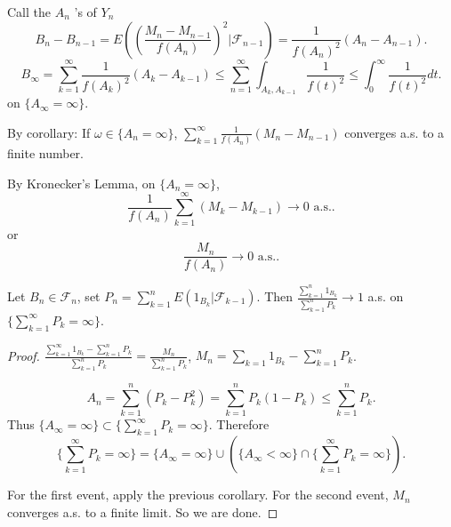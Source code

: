 
Call the $A_n$ 's of $Y_n$ 
\[
	B_n - B_{n-1}  = E\left( \left( \frac{M_n - M_{n-1}}{f(A_n)} \right) ^2  | \mathcal{F}_{n-1} \right) = \frac{1}{f(A_n)^2} (A_n - A_{n-1})
.\] 
\[
	B_\infty = \sum_{k = 1}^\infty \frac{1}{f(A_k)^2} (A_k - A_{k-1}) \le \sum_{n= 1}^\infty \int _{A_k, A_{k-1}} \frac{1}{f(t)^2} \le \int _0^\infty \frac{1}{f(t)^2} dt
.\] 
on $\{A_\infty  = \infty \} $.

By corollary: If $\omega \in \{A_n = \infty \} $,
$\sum_{k=1}^{\infty} \frac{1}{f(A_n)}(M_n - M_{n-1})$ converges a.s. to a finite number.

By Kronecker's Lemma, on $\{A_n = \infty \} $,
\[
	\frac{1}{f(A_n)}\sum_{k=1}^{\infty} (M_k - M_{k-1}) \to  0 \text{ a.s.}
.\] 
or
\[
	\frac{M_n}{f(A_n)} \to  0 \text{ a.s.}
.\] 

\begin{corollary}
	Let $B_n \in \mathcal{F}_n$, set $P_n = \sum_{k=1}^{n} E(1_{B_k} | \mathcal{F}_{k-1})$. Then $\frac{\sum_{k=1}^{n} 1_{B_k}}{\sum_{k=1}^{n} P_k} \to 1$ a.s. on $\{\sum_{k=1}^{\infty} P_k = \infty \} $.
\end{corollary}
\begin{proof}
	$\frac{\sum_{k=1}^{\infty} 1_{B_k} - \sum_{k = 1}^n P_k}{\sum_{k=1}^{n} P_k} = \frac{M_n}{\sum_{k = 1}^n P_k}$, $M_n = \sum_{k = 1}1_{B_k} - \sum_{k = 1}^n P_k$.

	\[
		A_n = \sum_{k=1}^{n} (P_k - P_k^2) 
		=\sum_{k=1}^{n} P_k (1 - P_k)
		\le \sum_{k=1}^{n} P_k
	.\] 
	Thus $\{A_\infty = \infty \} \subset \{\sum_{k=1}^{\infty} P_k = \infty \} $.
	Therefore
	\[
		\{\sum_{k=1}^{\infty} P_k = \infty \} 
		= \{A_\infty  = \infty \}  \cup 
		\left( \{A_\infty  < \infty \}  \cap  \{\sum_{k=1}^{\infty} P_k = \infty \}  \right) 
	.\] 

	For the first event, apply the previous corollary. For the second event, $M_n$ converges a.s. to a finite limit. So we are done.
\end{proof}


